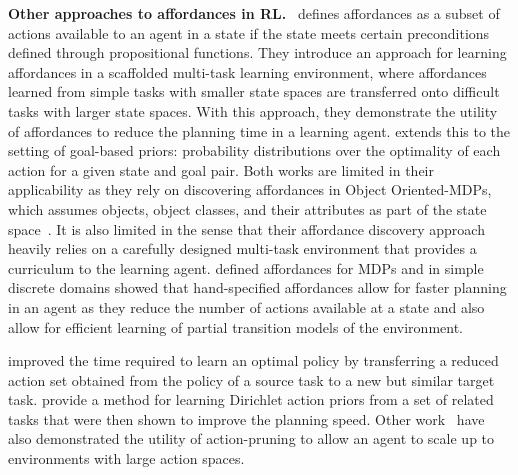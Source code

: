 \documentclass[nohyperref]{article}
\theoremstyle{plain}
\theoremstyle{definition}
\theoremstyle{remark}
\newcommand{\vivek}[1]{{\color{cyan}{\small\bf\sf [Vivek: #1]}}}
\newcommand{\rick}[1]{{\color{ForestGreen}{\small\bf\sf [Rick: #1]}}}
\renewcommand{\paragraph}[1]{\textbf{#1}\ }
\begin{document}
\paragraph{Other approaches to affordances in RL.}
\citet{abel2014toward} defines affordances as a subset of actions available to an agent in a state if the state meets certain preconditions defined through propositional functions. 
They introduce an approach for learning affordances in a scaffolded multi-task learning environment, where affordances learned from simple tasks with smaller state spaces are transferred onto difficult tasks with larger state spaces. With this approach, they demonstrate the utility of affordances to reduce the planning time in a learning agent. 
\citet{abel2015goal} extends this to the setting of goal-based priors: probability distributions over the optimality of each action for a given state and goal pair. Both  works are limited in their applicability as they rely on discovering affordances in Object Oriented-MDPs, which assumes  objects, object classes, and their attributes as  part of the state space~\citep{diuk2008object}. It is also limited in the sense that their affordance discovery approach heavily relies on a carefully designed multi-task environment that provides a curriculum to the learning agent. \citet{khetarpal2020can} defined affordances for MDPs and in simple discrete domains showed that hand-specified affordances allow for faster planning in an agent as they reduce the number of actions available at a state and also allow for efficient learning of partial transition models of the environment.

\citet{sherstov2005improving} improved the time required to learn an optimal policy by transferring a reduced action set obtained from the policy of a source task to a new but similar target task. \citet{rosman2012good} provide a method for learning Dirichlet action priors from a set of related tasks that 
were then shown to improve the planning speed. Other work~\citep{even2006action,cruz2014improving,cruz2016training,cruz2018multi,zahavy2018learn} have also demonstrated the utility of action-pruning to allow an agent to scale up to environments with large action spaces.
\end{document}
